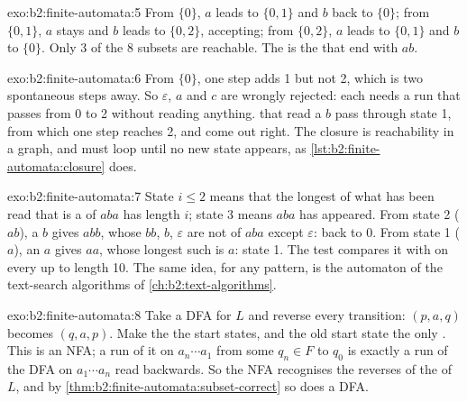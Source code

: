 \begin{solution}{exo:b2:finite-automata:5}
From $\{0\}$, $a$ leads to $\{0, 1\}$ and $b$ back to $\{0\}$; from $\{0, 1\}$, $a$ stays and $b$ leads to $\{0,
2\}$, accepting; from $\{0, 2\}$, $a$ leads to $\{0, 1\}$ and $b$ to $\{0\}$. Only 3 of the 8 subsets are reachable.
The  is the  that end with $ab$.
\end{solution}

\begin{solution}{exo:b2:finite-automata:6}
From $\{0\}$, one step adds 1 but not 2, which is two spontaneous steps away. So $\varepsilon$, $a$ and $c$ are
wrongly rejected: each needs a run that passes from 0 to 2 without reading anything.  that read a $b$ pass
through state 1, from which one step reaches 2, and come out right. The closure is reachability in a graph, and must
loop until no new state appears, as \cref{lst:b2:finite-automata:closure} does.
\end{solution}

\begin{solution}{exo:b2:finite-automata:7}
State $i \le 2$ means that the longest  of what has been read that is a  of $aba$ has length $i$; state 3
means $aba$ has appeared. From state 2 ($ab$), a $b$ gives $abb$, whose  $bb$, $b$, $\varepsilon$ are not
 of $aba$ except $\varepsilon$: back to 0. From state 1 ($a$), an $a$ gives $aa$, whose longest such  is
$a$: state 1. The test compares it with  on every  up to length 10. The same idea, for any
pattern, is the automaton of the text-search algorithms of \cref{ch:b2:text-algorithms}.
\end{solution}

\begin{solution}{exo:b2:finite-automata:8}
Take a DFA for $L$ and reverse every transition: $(p, a, q)$ becomes $(q, a, p)$. Make the  the start
states, and the old start state the only . This is an NFA; a run of it on $a_n \cdots a_1$ from some
$q_n \in F$ to $q_0$ is exactly a run of the DFA on $a_1 \cdots a_n$ read backwards. So the NFA recognises the
reverses of the  of $L$, and by \cref{thm:b2:finite-automata:subset-correct} so does a DFA.
\end{solution}

